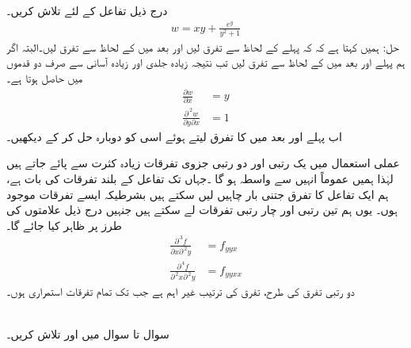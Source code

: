 درج ذیل تفاعل کے لئے  تلاش کریں۔
\begin{align*}
w=xy+\frac{e^y}{y^2+1}
\end{align*}
حل:\quad
ہمیں   کہتا ہے کہ کہ پہلے  کے لحاظ سے تفرق لیں اور بعد میں  کے لحاظ سے تفرق لیں۔البتہ اگر ہم پہلے  اور بعد میں  کے لحاظ  سے تفرق لیں تب  نتیجہ زیادہ جلدی   اور زیادہ  آسانی سے صرف دو  قدموں  میں   حاصل ہوتا ہے۔ 
\begin{align*}
\frac{\partial w}{\partial x}&=y\\
\frac{\partial^{\,2}w}{\partial y\partial x}&=1
\end{align*}
اب  پہلے  اور بعد میں  کا تفرق لیتے ہوئے اسی کو دوبارہ حل کر کے دیکھیں۔

عملی استعمال میں یک رتبی اور دو رتبی جزوی تفرقات   زیادہ کثرت سے پائے جاتے ہیں لہٰذا ہمیں عموماً انہیں سے واسطہ ہو گا ۔جہاں تک تفاعل کے بلند تفرقات  کی بات ہے، ہم ایک تفاعل کا تفرق  جتنی بار چاہیں لیں سکتے ہیں بشرطیکہ ایسے تفرقات موجود ہوں۔ یوں ہم تین رتبی اور چار رتبی تفرقات لے سکتے ہیں جنہیں درج ذیل علامتوں  کی طرز    پر  ظاہر کیا جائے گا۔
 \begin{align*}
\frac{\partial^{\,3}f}{\partial x\partial^{\,2}y}&=f_{yyx}\\
\frac{\partial^{\,4}f}{\partial^{\,2}x\partial^{\,2}y}&=f_{yyxx}
\end{align*}
دو رتبی تفرق کی طرح،   تفرق کی ترتیب غیر اہم ہے جب تک تمام  تفرقات استمراری ہوں۔


\\
سوال   تا سوال   میں  اور  تلاش کریں۔

